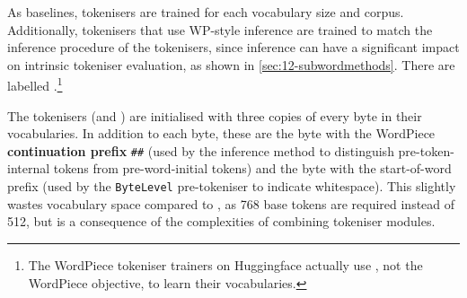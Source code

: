 As baselines, \bpe tokenisers are trained for each vocabulary size and corpus. Additionally, \bpe tokenisers that use WP-style inference are trained to match the inference procedure of the \tokname tokenisers, since inference can have a significant impact on intrinsic tokeniser evaluation, as shown in \cref{sec:12-subwordmethods}. There are labelled \bpewp.\footnote{The WordPiece tokeniser trainers on Huggingface actually use \bpe, not the WordPiece objective, to learn their vocabularies.}

The \tokname tokenisers (and \bpewp) are initialised with three copies of every byte in their vocabularies. In addition to each byte, these are the byte with the WordPiece \textbf{continuation prefix} \texttt{\#\#} (used by the inference method to distinguish pre-token-internal tokens from pre-word-initial tokens) and the byte with the start-of-word prefix (used by the \texttt{ByteLevel} pre-tokeniser to indicate whitespace). This slightly wastes vocabulary space compared to \bpe, as 768 base tokens are required instead of 512, but is a consequence of the complexities of combining tokeniser modules.

